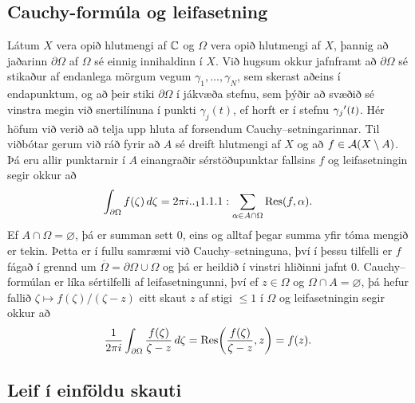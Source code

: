 \subsection*{Cauchy-formúla og leifasetning}


Látum $X$ vera opið hlutmengi af ${\mathbb C}$ og $\Omega$ vera opið hlutmengi
af $X$, þannig að jaðarinn $\partial\Omega$ af $\Omega$ sé einnig
innihaldinn í $X$.  Við hugsum okkur jafnframt að $\partial\Omega$ sé
stikaður af endanlega mörgum vegum $\gamma_1,\dots,\gamma_N$, sem
skerast aðeins í endapunktum, og að þeir stiki $\partial\Omega$ í
jákvæða stefnu, sem þýðir að svæðið sé vinstra megin við snertilínuna
í punkti $\gamma_j(t)$, ef horft er í stefnu $\gamma_j{\sp{\prime}}(t)$.  Hér
höfum við verið að telja upp hluta af forsendum Cauchy--setningarinnar.  Til
viðbótar gerum við ráð fyrir að $A$ sé dreift hlutmengi af $X$  og að
$f\in {\cal A}(X\setminus A)$.  Þá eru allir punktarnir í $A$ einangraðir
sérstöðupunktar fallsins $f$ og leifasetningin segir okkur að
 \begin{equation*}\int _{\partial {\Omega}} f(\zeta)\, d\zeta =2\pi i

.. _11.1.1:

\sum\limits_{\alpha\in A\cap \Omega}
\Res (f,\alpha).
 \end{equation*}
Ef $A\cap \Omega=\varnothing$, þá er summan sett $0$, eins og alltaf
þegar summa yfir tóma mengið er tekin.  Þetta er í fullu samræmi við
Cauchy--setninguna, því í þessu tilfelli er $f$ fágað í grennd um
$\overline\Omega=\partial\Omega\cup \Omega$ og þá er heildið í
vinstri hliðinni jafnt $0$.   Cauchy--formúlan er líka sértilfelli af
leifasetningunni, því ef $z\in \Omega$ og $\Omega\cap A=\varnothing$,
þá hefur fallið $\zeta\mapsto f(\zeta)/(\zeta-z)$ eitt skaut $z$ af
 stigi $\leq 1$ í $\Omega$ og leifasetningin segir okkur að
 $$\dfrac 1{2\pi i}\int_{\partial\Omega} \dfrac{f(\zeta)}{\zeta-z}\,
d\zeta = {\operatorname{Res}} \bigg( \dfrac{f(\zeta)}{\zeta-z},z\bigg)=f(z).
 $$

\subsection*{Leif í einföldu skauti}

